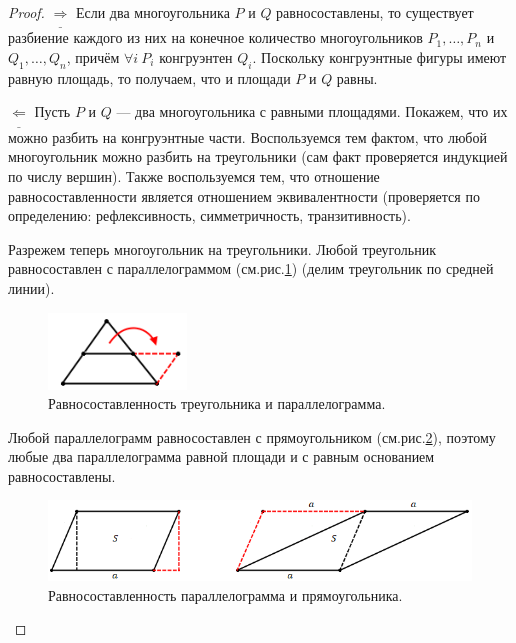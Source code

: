 \begin{proof}
    $\underline{\Longrightarrow}$ Если два многоугольника $P$ и $Q$ равносоставлены, то существует разбиение каждого из них на конечное количество многоугольников $P_1, \dots, P_n$ и $Q_1, \dots, Q_n$, причём $\forall i \ P_i$ конгруэнтен $Q_i$. Поскольку конгруэнтные фигуры имеют равную площадь, то получаем, что и площади $P$ и $Q$ равны.

    $\underline{\Longleftarrow}$ Пусть $P$ и $Q$ — два многоугольника с равными площадями. Покажем, что их можно разбить на конгруэнтные части. Воспользуемся тем фактом, что любой многоугольник можно разбить на треугольники (сам факт проверяется индукцией по числу вершин). Также воспользуемся тем, что отношение равносоставленности является отношением эквивалентности (проверяется по определению: рефлексивность, симметричность, транзитивность).

    Разрежем теперь многоугольник на треугольники. Любой треугольник равносоставлен с параллелограммом (см.рис.\ref{fig:c8.1}) (делим треугольник по средней линии).

    \begin{figure}[htbp]
        \centering
        \includegraphics[scale=1]{images/c8.1.png}
        \caption{Равносоставленность треугольника и параллелограмма.}
        \label{fig:c8.1}
    \end{figure}

    Любой параллелограмм равносоставлен с прямоугольником (см.рис.\ref{fig:c8.2}), поэтому любые два параллелограмма равной площади и с равным основанием равносоставлены.

    \begin{figure}[htbp]
        \centering
        \includegraphics[scale=0.7]{images/c8.2.png}
        \caption{Равносоставленность параллелограмма и прямоугольника.}
        \label{fig:c8.2}
    \end{figure}


\end{proof}
